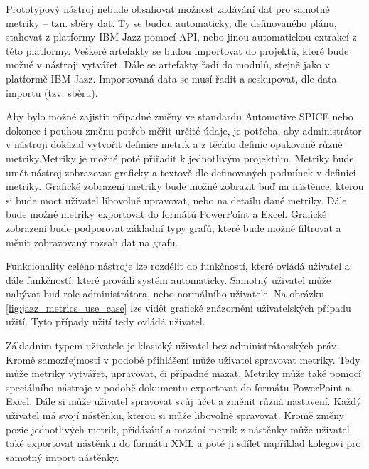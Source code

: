 \documentclass[czech,master,public,dept460,male,cpdeclaration,oneside]{diploma}
\begin{document}
Prototypový nástroj nebude obsahovat možnost zadávání dat pro samotné metriky -- tzn. sběry dat. Ty se budou automaticky, dle definovaného plánu, stahovat z platformy IBM Jazz pomocí API, nebo jinou automatickou extrakcí z této platformy. Veškeré artefakty se budou importovat do projektů, které bude možné v nástroji vytvářet. Dále se artefakty řadí do modulů, stejně jako v platformě IBM Jazz. Importovaná data se musí řadit a seskupovat, dle data importu (tzv. sběru).

Aby bylo možné zajistit případné změny ve standardu Automotive SPICE nebo dokonce i pouhou změnu potřeb měřit určité údaje, je potřeba, aby administrátor v nástroji dokázal vytvořit definice metrik a z těchto definic opakovaně různé metriky.Metriky je možné poté přiřadit k jednotlivým projektům. Metriky bude umět nástroj zobrazovat graficky a textově dle definovaných podmínek v definici metriky. Grafické zobrazení metriky bude možné zobrazit buď na nástěnce, kterou si bude moct uživatel libovolně upravovat, nebo na detailu dané metriky. Dále bude možné metriky exportovat do formátů PowerPoint a Excel. Grafické zobrazení bude podporovat základní typy grafů, které bude možné filtrovat a měnit zobrazovaný rozsah dat na grafu.

Funkcionality celého nástroje lze rozdělit do funkčností, které ovládá uživatel a dále funkčností, které provádí systém automaticky. Samotný uživatel může nabývat buď role administrátora, nebo normálního uživatele. Na obrázku \ref{fig:jazz_metrics_use_case} lze vidět grafické znázornění uživatelských případu užití. Tyto případy užití tedy ovládá uživatel.

Základním typem uživatele je klasický uživatel bez administrátorských práv. Kromě samozřejmosti v podobě přihlášení může uživatel spravovat metriky. Tedy může metriky vytvářet, upravovat, či případně mazat. Metriky může také pomocí speciálního nástroje v podobě dokumentu exportovat do formátu PowerPoint a Excel. Dále si může uživatel spravovat svůj účet a změnit různá nastavení. Každý uživatel má svojí nástěnku, kterou si může libovolně spravovat. Kromě změny pozic jednotlivých metrik, přidávání a mazání metrik z nástěnky může uživatel také exportovat nástěnku do formátu XML a poté ji sdílet například kolegovi pro samotný import nástěnky.
\end{document}
